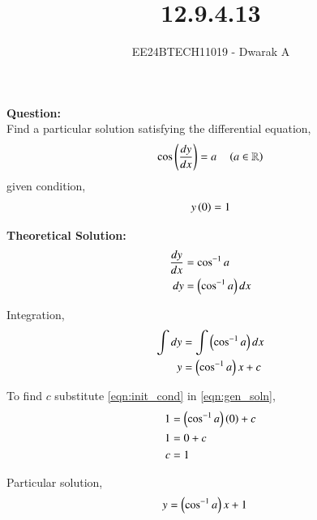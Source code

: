 \documentclass[journal]{IEEEtran}
\begin{document}

\vspace{3cm}

\title{12.9.4.13}
\author{EE24BTECH11019 - Dwarak A}
{\let\newpage\relax\maketitle}

\renewcommand{\thefigure}{\theenumi}
\renewcommand{\thetable}{\theenumi}
\setlength{\intextsep}{10pt} %


\renewcommand{\thetable}{\theenumi}

\textbf{Question:}\\
Find a particular solution satisfying the differential equation,
\begin{align}
    \cos{\ensuremath{\left(\frac{dy}{dx}\right)}} = a \quad \left(a\in\mathbb{R}\right)
\end{align}
given condition,
\begin{align}
    y\left(0\right) = 1
    \label{eqn:init_cond}
\end{align}

\solution

\medskip

\textbf{Theoretical Solution:}
\begin{align}
    \frac{dy}{dx} &= \cos^{-1}a \\
    dy &= \left(\cos^{-1}a\right)dx
\end{align}

Integration,
\begin{align}
    \int dy &= \int \left(\cos^{-1}a\right)dx \\
    y &= \left(\cos^{-1}a\right)x + c
    \label{eqn:gen_soln}
\end{align}

To find $c$ substitute \eqref{eqn:init_cond} in \eqref{eqn:gen_soln},
\begin{align}
    1 &= \left(\cos^{-1}a\right)\left(0\right) + c \\
    1 &= 0 + c \\
    c &= 1
\end{align}

Particular solution,
\begin{align}
    y &= \left(\cos^{-1}a\right)x + 1
\end{align}
\end{document}
